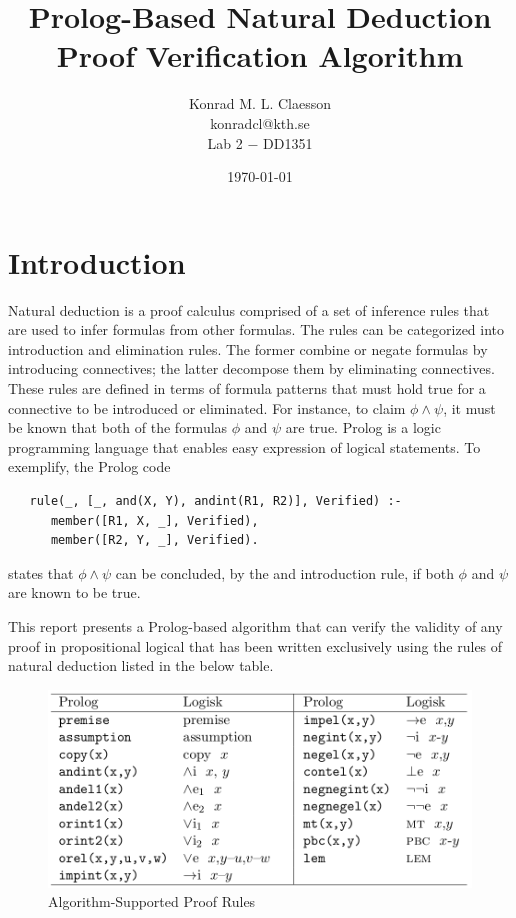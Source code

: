 \documentclass[a4paper, 11pt]{article}
\title{Prolog-Based Natural Deduction Proof Verification
Algorithm}
\author
{
   Konrad M. L. Claesson \\
   konradcl@kth.se \\
   Lab 2 $-$ DD1351
}
\date{\today}
\begin{document}
   \maketitle
   \thispagestyle{empty}   %
   
   \clearpage
   \newpage

   \tableofcontents
   \newpage

   \section{Introduction}
   Natural deduction is a proof calculus comprised of a set of
   inference rules that are used to infer formulas from other
   formulas. The rules can be categorized into introduction
   and elimination rules. The former combine or negate
   formulas by introducing connectives; the latter decompose
   them by eliminating connectives. These rules are defined in
   terms of formula patterns that must hold true for a 
   connective to be introduced or eliminated. For instance, to
   claim $\phi \wedge \psi$, it must be known that
   both of the formulas $\phi$ and $\psi$ are true. Prolog is
   a logic programming language that enables easy expression 
   of logical statements. To exemplify, the Prolog code
   
\begin{verbatim}
   rule(_, [_, and(X, Y), andint(R1, R2)], Verified) :-
      member([R1, X, _], Verified),
      member([R2, Y, _], Verified).
\end{verbatim}
   
   states that $\phi \wedge \psi$ can be concluded, by the and
   introduction rule, if both $\phi$ and $\psi$ are known to
   be true. 
   \bigbreak

   This report presents a Prolog-based algorithm that can
   verify the validity of any proof in propositional logical 
   that has been written exclusively using the rules of
   natural deduction listed in the below table.

   \begin{figure}[h]
      \centering
      \includegraphics[scale=0.325]{inference-rules}
      \caption{Algorithm-Supported Proof Rules}
   \end{figure}
\end{document}
